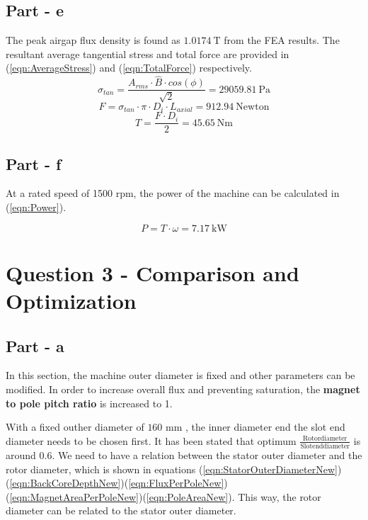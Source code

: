 \documentclass{article}
\begin{document}
\subsection{Part - e}
The peak airgap flux density is found as $1.0174\: \mathrm{T} $ from the FEA results. The resultant average tangential stress and total force are provided in (\ref{eqn:AverageStress}) and (\ref{eqn:TotalForce}) respectively.
\begin{equation} \label{eqn:AverageStress}
    \sigma_{tan} = \frac{A_{rms} \cdot \hat{B} \cdot cos(\phi)}{\sqrt{2}} = 29059.81 \: \mathrm{Pa}
\end{equation}
\begin{equation} \label{eqn:TotalForce}
    F = \sigma_{tan} \cdot \pi \cdot D_i \cdot L_{axial} = 912.94 \: \mathrm{Newton}
\end{equation}
\begin{equation} \label{eqn:Torque}
    T = \frac{F \cdot D_i}{2} = 45.65 \: \mathrm{Nm}
\end{equation}

\subsection{Part - f}
At a rated speed of 1500 rpm, the power of the machine can be calculated in (\ref{eqn:Power}).

\begin{equation} \label{eqn:Power}
    P = T \cdot \omega  = 7.17 \: \mathrm{kW}
\end{equation}


\section{Question 3 - Comparison and Optimization }
\subsection{Part - a}
In this section, the machine outer diameter is fixed and other parameters can be modified. In order to increase overall flux and preventing saturation, the \textbf{magnet to pole pitch ratio} is increased to 1. 

With a fixed outher diameter of $160$ \: mm , the inner diameter end the slot end diameter needs to be chosen first. It has been stated that optimum $\frac{\mathrm{Rotor diameter}}{\mathrm{Slot end diameter}}$ is around 0.6. We need to have a relation between the stator outer diameter and the rotor diameter, which is shown in equations (\ref{eqn:StatorOuterDiameterNew})(\ref{eqn:BackCoreDepthNew})(\ref{eqn:FluxPerPoleNew})(\ref{eqn:MagnetAreaPerPoleNew})(\ref{eqn:PoleAreaNew}). This way, the rotor diameter can be related to the stator outer diameter.
\end{document}
